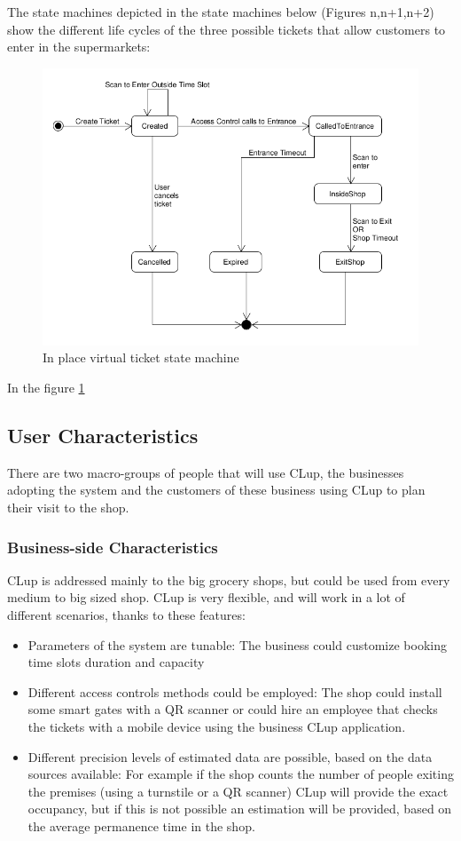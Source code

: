 The state machines depicted in the state machines below (Figures n,n+1,n+2) show the different life cycles of the three possible tickets that allow customers to enter in the supermarkets:
\begin{figure}
    \centering
    \includegraphics[width=\textwidth]{Images/UML_in_place_virtual_ticket.png}
    \caption{ \label{fig:Booked_Ticket_State}In place virtual ticket state machine}
\end{figure}
In the figure \ref{fig:Booked_Ticket_State}
\subsection{User Characteristics}
There are two macro-groups of people that will use CLup, the businesses adopting the system and the customers of these
business using CLup to plan their visit to the shop.
\subsubsection{Business-side Characteristics}
CLup is addressed mainly to the big grocery shops, but could be used from every medium to big sized shop.
CLup is very flexible, and will work in a lot of different scenarios, thanks to these features:
\begin{itemize}
    \item Parameters of the system are tunable: The business could customize booking time slots duration and capacity
    \item Different access controls methods could be employed: The shop could install some smart gates with a QR scanner
          or could hire an employee that checks the tickets with a mobile device using the business CLup application.
    \item Different precision levels of estimated data are possible, based on the data sources available:
          For example if the shop counts the number of people exiting the premises (using a turnstile or a QR scanner)
          CLup will provide the exact occupancy, but if this is not possible an estimation will be provided, based on the
          average permanence time in the shop.

\end{itemize}
